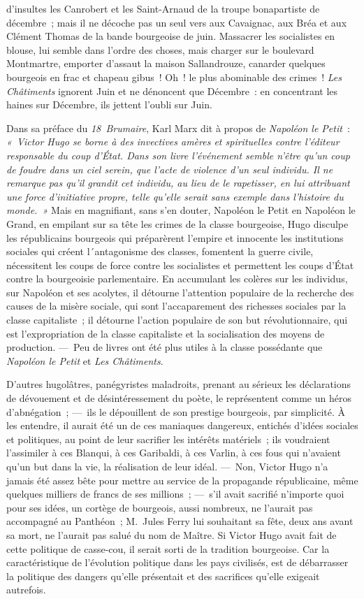 \documentclass[french,twoside]{book} %
\begin{document}
\label{p35}d’insultes les Canrobert et les Saint-Arnaud de la troupe bonapartiste de décembre ; mais il ne décoche pas un seul vers aux Cavaignac, aux Bréa et aux Clément Thomas de la bande bourgeoise de juin. Massacrer les socialistes en blouse, lui semble dans l’ordre des choses, mais charger sur le boulevard Montmartre, emporter d’assaut la maison Sallandrouze, canarder quelques bourgeois en frac et chapeau gibus ! Oh ! le plus abominable des crimes ! \emph{Les Châtiments} ignorent Juin et ne dénoncent que Décembre : en concentrant les haines sur Décembre, ils jettent l’oubli sur Juin.\par
Dans sa préface du \emph{18 Brumaire}, Karl Marx dit à propos de \emph{Napoléon le Petit} : \emph{« Victor Hugo se borne à des invectives amères et spirituelles contre l’éditeur responsable du coup d’État. Dans son livre l’événement semble n’être qu’un coup de foudre dans un ciel serein, que l’acte de violence d’un seul individu. Il ne remarque pas qu’il grandit cet individu, au lieu de le rapetisser, en lui attribuant une force d’initiative propre, telle qu’elle serait sans exemple dans l’histoire du monde. »} Mais en magnifiant, sans s’en douter, Napoléon le Petit en Napoléon le Grand, en empilant sur sa tête les crimes de la classe bourgeoise, Hugo disculpe les républicains bourgeois qui préparèrent l’empire et innocente les institutions sociales qui créent l´antagonisme des classes, fomentent la guerre civile, nécessitent les coups de force contre les socialistes et permettent les coups d’État contre la bourgeoisie parlementaire. En accumulant les colères sur les individus, sur Napoléon et ses acolytes, il détourne  
\label{p36}l’attention populaire de la recherche des causes de la misère sociale, qui sont l’accaparement des richesses sociales par la classe capitaliste ; il détourne l’action populaire de son but révolutionnaire, qui est l’expropriation de la classe capitaliste et la socialisation des moyens de production. — Peu de livres ont été plus utiles à la classe possédante que \emph{Napoléon le Petit} et \emph{Les Châtiments}.\par
D’autres hugolâtres, panégyristes maladroits, prenant au sérieux les déclarations de dévouement et de désintéressement du poète, le représentent comme un héros d’abnégation ; — ils le dépouillent de son prestige bourgeois, par simplicité. À les entendre, il aurait été un de ces maniaques dangereux, entichés d’idées sociales et politiques, au point de leur sacrifier les intérêts matériels ; ils voudraient l’assimiler à ces Blanqui, à ces Garibaldi, à ces Varlin, à ces fous qui n’avaient qu’un but dans la vie, la réalisation de leur idéal. — Non, Victor Hugo n’a jamais été assez bête pour mettre au service de la propagande républicaine, même quelques milliers de francs de ses millions ; — s’il avait sacrifié n’importe quoi pour ses idées, un cortège de bourgeois, aussi nombreux, ne l’aurait pas accompagné au Panthéon ; M. Jules Ferry lui souhaitant sa fête, deux ans avant sa mort, ne l’aurait pas salué du nom de Maître. Si Victor Hugo avait fait de cette politique de casse-cou, il serait sorti de la tradition bourgeoise. Car la caractéristique de l’évolution politique dans les pays civilisés, est de débarrasser la politique des dangers qu’elle présentait et des sacrifices qu’elle exigeait autrefois.  
\end{document}
